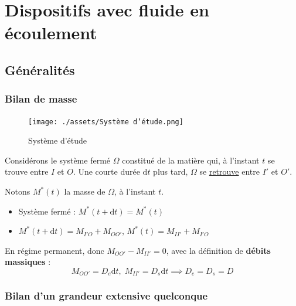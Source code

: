 
\newpage 
\section{Dispositifs avec fluide en écoulement} %
\label{sec:Dispositifs avec fluide en écoulement}

\subsection{Généralités} %
\label{sub:Généralités}

\subsubsection{Bilan de masse} %
\label{sec:Bilan de masse}


\begin{figure}[H] %
  \centering
  \texttt{[image: ./assets/Système d'étude.png]}
  \caption{Système d'étude}
  \label{fig:Système d'étude}
\end{figure}




Considérons le système fermé $\Omega$ constitué de la matière qui, à l'instant $t$ se trouve entre $I$ et $O$. Une courte durée $\mathrm{d}t$ plus tard, $\Omega$ se \underline{retrouve} entre $I'$ et $O'$. 

Notons $M ^{*}(t)$ la masse de $\Omega$, à l'instant $t$. 
\begin{itemize}

    \item Système fermé : $M ^{*}( t+ \mathrm{d} t) = M ^{*}(t)$ 
    \item $M ^{*}(t + \mathrm{d} t) = M _{I'O} + M _{OO'}$, $M ^{*}(t) = M _{II'}+ M _{I'O}$

\end{itemize}

En régime permanent, donc $M _{OO' }- M _{II' }= 0$, avec la définition de \textbf{débits massiques} : 
\begin{equation}
  M _{OO'} = D_e \mathrm{d} t, \; M _{II'} = D_s \mathrm{d} t \implies D_e = D_s = D
\end{equation}

\subsubsection{Bilan d'un grandeur extensive quelconque} %
\label{sec:Bilan d'un grandeur extensive quelconque}

